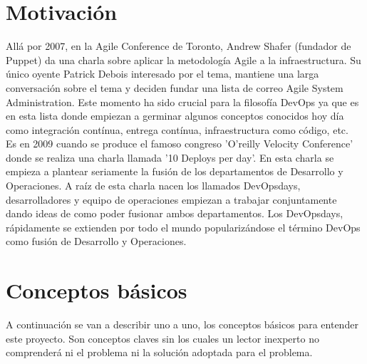 \section{Motivación}

	\begin{paragraph}
		Allá por 2007, en la Agile Conference de Toronto, Andrew Shafer (fundador de Puppet) da una charla sobre aplicar la metodología Agile a la infraestructura. Su único oyente Patrick Debois interesado por el tema, mantiene una larga conversación sobre el tema y deciden fundar una lista de correo Agile System Administration. Este momento ha sido crucial para la filosofía DevOps ya que es en esta lista donde empiezan a germinar algunos conceptos conocidos hoy día como integración contínua, entrega contínua, infraestructura como código, etc.\\
		Es en 2009 cuando se produce el famoso congreso  'O'reilly Velocity Conference' donde se realiza una charla llamada '10 Deploys per day'. En esta charla se empieza a plantear seriamente la fusión de los departamentos de Desarrollo y Operaciones. A raíz de esta charla nacen los llamados DevOpsdays, desarrolladores y equipo de operaciones empiezan a trabajar conjuntamente dando ideas de como poder fusionar ambos departamentos. Los DevOpsdays, rápidamente se extienden por todo el mundo popularizándose el término DevOps como fusión de Desarrollo y Operaciones.
	\end{paragraph}
\section{Conceptos básicos}
		\begin{paragraph}
			A continuación se van a describir uno a uno, los conceptos básicos para entender este proyecto. Son conceptos claves sin los cuales un lector inexperto no comprenderá ni el problema ni la solución adoptada para el problema.
		\end{paragraph}
